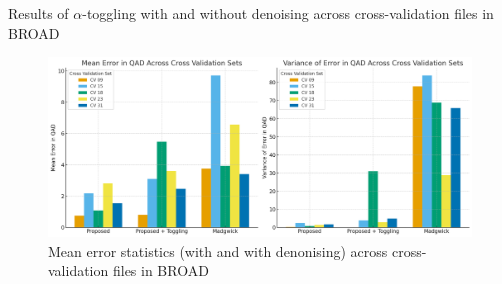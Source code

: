 \documentclass[aspectratio=169,xcolor=dvipsnames]{beamer}
\begin{document}
    

\begin{frame}{Results of $\alpha$-toggling with and without denoising across cross-validation files in BROAD}
\small

\begin{figure}
    \centering
    \includegraphics[width=\linewidth,height=0.65\textheight,keepaspectratio]{logos/barchart_correct_slide.png}
    \caption{Mean error statistics (with and with denonising) across cross-validation files in BROAD}
    \label{fig:rmnoise_chart}
\end{figure}
\hfill
\end{frame}
\end{document}

